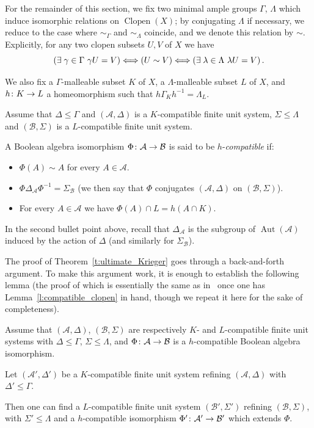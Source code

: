 \documentclass[AHL,Unicode]{cedram}
\DeclareMathOperator{\Clopen}{Clopen}
\DeclareMathOperator{\Aut}{Aut}
\newcommand{\mcA}{\mathcal{A}}
\newcommand{\mcB}{\mathcal{B}}
\let\oldexists\exists
\renewcommand*{\exists}{\mathrel{\oldexists}}
\renewcommand*{\to}{\mathchoice{\longrightarrow}{\rightarrow}{\rightarrow}{\rightarrow}}
\let\oldLeftrightarrow\Leftrightarrow
\renewcommand*{\Leftrightarrow}{\mathchoice{\Longleftrightarrow}{\oldLeftrightarrow}{\oldLeftrightarrow}{\oldLeftrightarrow}}
\begin{document}
For the remainder of this section, we fix two minimal ample groups $\Gamma$, $\Lambda$ which induce isomorphic relations on $\Clopen(X)$; by conjugating $\Lambda$ if necessary, we reduce to the case where $\sim_\Gamma$ and $\sim_\Lambda$ coincide, and we denote this relation by $\sim$. Explicitly, for any two clopen subsets $U,V$ of $X$ we have
\[
\left(\exists \gamma \in \Gamma \ \gamma U=V \right) \Leftrightarrow (U \sim V) \Leftrightarrow \left(\exists \lambda \in \Lambda \ \lambda U=V \right).
\]

We also fix a $\Gamma$-malleable subset $K$ of $X$, a $\Lambda$-malleable subset $L$ of $X$, and $h \colon K \to L$ a homeomorphism such that $h \Gamma_K h^{-1}=\Lambda_L$.

\begin{defi}
Assume that $\Delta \le \Gamma$ and $(\mcA,\Delta)$ is a $K$-compatible finite unit system, $\Sigma \le \Lambda$ and $(\mcB,\Sigma)$ is a $L$-compatible finite unit system.

A Boolean algebra isomorphism $\Phi \colon \mcA \to \mcB$ is said to be $h$-\emph{compatible} if:
\begin{itemize}
\item $\Phi(A) \sim A$ for every $A \in \mcA$.
\item $\Phi \Delta_{\mcA} \Phi^{-1}= \Sigma_\mcB$ (we then say that $\Phi$ conjugates $(\mcA,\Delta)$ on $(\mcB,\Sigma)$).
\item For every $A \in \mcA$ we have $\Phi(A) \cap L= h(A \cap K)$.
\end{itemize}
\end{defi}

In the second bullet point above, recall that $\Delta_\mcA$ is the subgroup of $\Aut(\mcA)$ induced by the action of $\Delta$ (and similarly for $\Sigma_\mcB$).

The proof of Theorem~\ref{t:ultimate_Krieger} goes through a back-and-forth argument. To make this argument work, it is enough to establish the following lemma (the proof of which is essentially the same as in~\cite[Lemma~3.17]{Melleray2023} once one has Lemma~\ref{l:compatible_clopen} in hand, though we repeat it here for the sake of completeness).

\begin{lemm}\label{l:Krieger_construction}
Assume that $(\mcA,\Delta)$, $(\mcB,\Sigma)$ are respectively $K$- and $L$-compatible finite unit systems with $\Delta \le \Gamma$, $\Sigma \le \Lambda$, and $\Phi \colon \mcA \to \mcB$ is a $h$-compatible Boolean algebra isomorphism.

Let $(\mcA',\Delta')$ be a $K$-compatible finite unit system refining $(\mcA,\Delta)$ with $\Delta' \le \Gamma$.

Then one can find a $L$-compatible finite unit system $(\mcB',\Sigma')$ refining $(\mcB,\Sigma)$, with $\Sigma' \le \Lambda$ and a $h$-compatible isomorphism $\Phi' \colon \mcA' \to \mcB'$ which extends $\Phi$.
\end{lemm}
\end{document}
